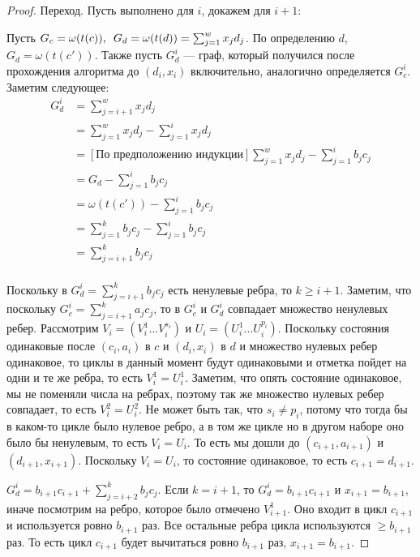\documentclass{article}
\newcommand{\squad}{
    \hspace{0.5em}
}
\begin{document}
\begin{proof}
    \medskip

    Переход. Пусть выполнено для $i$, докажем для $i + 1$:

    Пусть $G_{c} = \omega(t(c)), \squad G_{d} = \omega(t(d)) = \sum_{j = 1}^{w}{x_{j}d_{j}}$. По определению $d$, $G_{d} = \omega(t(c'))$. Также пусть $G_{d}^{i}$ --- граф, который получился после прохождения алгоритма до $(d_{i}, x_{i})$ включительно, аналогично определяется $G_{c}^{i}$.
    Заметим следующее:
    \begin{align*}
        G_{d}^{i} &= \sum_{j = i + 1}^{w}{x_{j}d_{j}} \\
                  &= \sum_{j = 1}^{w}{x_{j}d_{j}} - \sum_{j = 1}^{i}{x_{j}d_{j}} \\ 
                  &= \left[\text{По предположению индукции}\right] \sum_{j = 1}^{w}{x_{j}d_{j}} - \sum_{j = 1}^{i}{b_{j}c_{j}} \\
                  &= G_{d} - \sum_{j = 1}^{i}{b_{j}c_{j}} \\
                  &= \omega(t(c')) - \sum_{j = 1}^{i}{b_{j}c_{j}} \\
                  &= \sum_{j = 1}^{k}{b_{j}c_{j}} - \sum_{j = 1}^{i}{b_{j}c_{j}} \\
                  &= \sum_{j = i + 1}^{k}{b_{j}c_{j}} \\
    \end{align*}

    Поскольку в $G_{d}^{i} = \sum_{j = i + 1}^{k}{b_{j}c_{j}}$ есть ненулевые ребра, то $k \geq i + 1$.
    Заметим, что поскольку $G_{c}^{i} = \sum_{j = i + 1}^{k}{a_{j}c_{j}}$, то в $G_{c}^{i}$ и $G_{d}^{i}$ совпадает множество ненулевых ребер. Рассмотрим $V_{i} = (V_{i}^{1} \ldots V_{i}^{s_{i}})$ и $U_{i} = (U_{i}^{1} \ldots U_{i}^{p_{i}})$. Поскольку состояния одинаковые после $(c_{i}, a_{i})$ в $c$ и $(d_{i}, x_{i})$ в $d$ и множество нулевых ребер одинаковое, то циклы в данный момент будут одинаковыми и отметка пойдет на одни и те же ребра, то есть $V_{i}^{1} = U_{i}^{1}$. Заметим, что опять состояние одинаковое, мы не поменяли числа на ребрах, поэтому так же множество нулевых ребер совпадает, то есть $V_{i}^{2} = U_{i}^{2}$. Не может быть так, что $s_{i} \neq p_{i}$, потому что тогда бы в каком-то цикле было нулевое ребро, а в том же цикле но в другом наборе оно было бы ненулевым, то есть $V_{i} = U_{i}$. То есть мы дошли до $(c_{i + 1}, a_{i + 1})$ и $(d_{i + 1}, x_{i + 1})$. Поскольку $V_{i} = U_{i}$, то состояние одинаковое, то есть $c_{i + 1} = d_{i + 1}$.

    $G_{d}^{i} = b_{i + 1}c_{i + 1} + \sum_{j = i + 2}^{k}{b_{j}c_{j}}$. Если $k = i + 1$, то $G_{d}^{i} = b_{i + 1}c_{i + 1}$ и $x_{i + 1} = b_{i + 1}$, иначе посмотрим на ребро, которое было отмечено $V_{i + 1}^{1}$. Оно входит в цикл $c_{i + 1}$ и используется ровно $b_{i + 1}$ раз. Все остальные ребра цикла используются $\geq b_{i + 1}$ раз. То есть цикл $c_{i + 1}$ будет вычитаться ровно $b_{i + 1}$ раз, $x_{i + 1} = b_{i + 1}$.


\end{proof}
\end{document}

